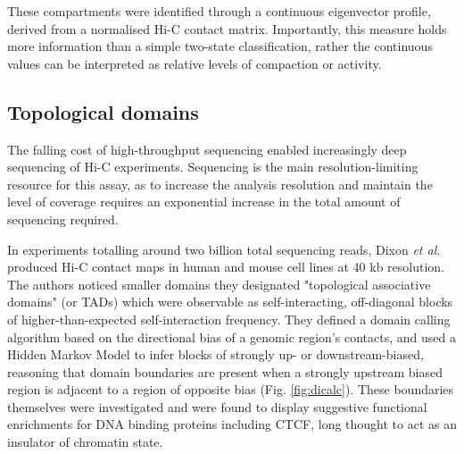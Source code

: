 \documentclass[a4paper,10pt,oneside]{book}
\begin{document}
These compartments were identified through a continuous eigenvector profile, derived from a normalised Hi-C contact matrix.\cite{Lieberman2009} Importantly, this measure holds more information than a simple two-state classification, rather the continuous values can be interpreted as relative levels of compaction or activity.\cite{Dekker2013, Imakaev2012}

\subsection{Topological domains}

The falling cost of high-throughput sequencing enabled increasingly deep sequencing of Hi-C experiments. Sequencing is the main resolution-limiting resource for this assay, as to increase the analysis resolution and maintain the level of coverage requires an exponential increase in the total amount of sequencing required.\cite{Lieberman2009}

In experiments totalling around two billion total sequencing reads, Dixon \emph{et al.}\cite{Dixon2012} produced Hi-C contact maps in human and mouse cell lines at 40 kb resolution. The authors noticed smaller domains they designated "topological associative domains" (or TADs) which were observable as self-interacting, off-diagonal blocks of higher-than-expected self-interaction frequency. They defined a domain calling algorithm based on the directional bias of a genomic region's contacts, and used a Hidden Markov Model to infer blocks of strongly up- or downstream-biased, reasoning that domain boundaries are present when a strongly upstream biased region is adjacent to a region of opposite bias (Fig. \ref{fig:dicalc}). These boundaries themselves were investigated and were found to display suggestive functional enrichments for DNA binding proteins including CTCF, long thought to act as an insulator of chromatin state.
\end{document}
